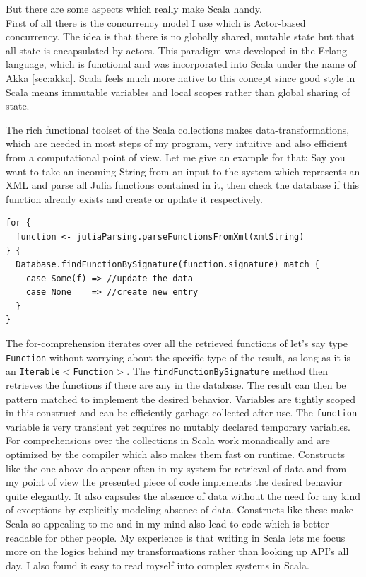 \documentclass[twoside, 11pt]{scrartcl}
\def\code#1{\texttt{#1}}
\begin{document}
But there are some aspects which really make Scala handy.\\
First of all there is the concurrency model I use which is Actor-based concurrency. The idea is that there is no globally shared, mutable state but that all state is encapsulated by actors. This paradigm was developed in the Erlang language, which is functional and was incorporated into Scala under the name of Akka \ref{sec:akka}. Scala feels much more native to this concept since good style in Scala means immutable variables and local scopes rather than global sharing of state.

The rich functional toolset of the Scala collections makes data-transformations, which are needed in most steps of my program, very intuitive and also efficient from a computational point of view. Let me give an example for that: Say you want to take an incoming String from an input to the system which represents an XML and parse all Julia functions contained in it, then check the database if this function already exists and create or update it respectively.

\begin{verbatim}
for {
  function <- juliaParsing.parseFunctionsFromXml(xmlString)
} {
  Database.findFunctionBySignature(function.signature) match {
    case Some(f) => //update the data
    case None    => //create new entry
  }
}
\end{verbatim}

The for-comprehension iterates over all the retrieved functions of let's say type \code{Function} without worrying about the specific type of the result, as long as it is an \code{Iterable$<$Function$>$}. The \code{findFunctionBySignature} method then retrieves the functions if there are any in the database. The result can then be pattern matched to implement the desired behavior. Variables are tightly scoped in this construct and can be efficiently garbage collected after use. The \code{function} variable is very transient yet requires no mutably declared temporary variables.
For comprehensions over the collections in Scala work monadically and are optimized by the compiler which also makes them fast on runtime. Constructs like the one above do appear often in my system for retrieval of data and from my point of view the presented piece of code implements the desired behavior quite elegantly. It also capsules the absence of data without the need for any kind of exceptions by explicitly modeling absence of data. Constructs like these make Scala so appealing to me and in my mind also lead to code which is better readable for other people. My experience is that writing in Scala lets me focus more on the logics behind my transformations rather than looking up API's all day. I also found it easy to read myself into complex systems in Scala.
\end{document}
